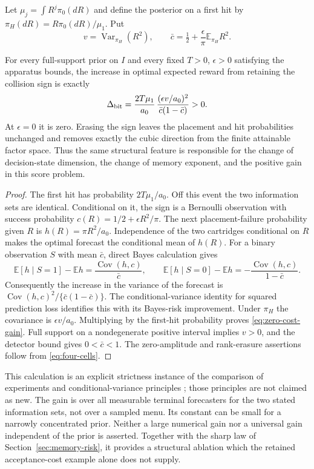 Let $\mu_j=\int R^j\pi_0(dR)$ and define the posterior on a first hit by
$\pi_H(dR)=R\pi_0(dR)/\mu_1$. Put
\[
 v=\operatorname{Var}_{\pi_H}(R^2),\qquad
 \bar c=\tfrac12+\frac\epsilon\pi\mathbb E_{\pi_H}R^2.
\]
\begin{theorem}\label{thm:zero-cost-gain}
For every full-support prior on $I$ and every fixed $T>0$, $\epsilon>0$
satisfying the apparatus bounds, the increase in optimal expected reward
from retaining the collision sign is exactly
\begin{equation}\label{eq:zero-cost-gain}
 \Delta_{\rm bit}
 =\frac{2T\mu_1}{a_0}\,
   \frac{(\epsilon v/a_0)^2}{\bar c(1-\bar c)}
 >0.
\end{equation}
At $\epsilon=0$ it is zero. Erasing the sign leaves the placement and hit
probabilities unchanged and removes exactly the cubic direction from the
finite attainable factor space. Thus the same structural feature is
responsible for the change of decision-state dimension, the change of
memory exponent, and the positive gain in this score problem.
\end{theorem}
\begin{proof}
The first hit has probability $2T\mu_1/a_0$. Off this event the two
information sets are identical. Conditional on it, the sign is a Bernoulli
observation with success probability
$c(R)=1/2+\epsilon R^2/\pi$. The next placement-failure probability given
$R$ is $h(R)=\pi R^2/a_0$. Independence of the two cartridges conditional
on $R$ makes the optimal forecast the conditional mean of $h(R)$.
For a binary observation $S$ with mean $\bar c$, direct Bayes calculation
gives
\[
 \mathbb E[h\mid S=1]-\mathbb E h
     =\frac{\operatorname{Cov}(h,c)}{\bar c},\qquad
 \mathbb E[h\mid S=0]-\mathbb E h
     =-\frac{\operatorname{Cov}(h,c)}{1-\bar c}.
\]
Consequently the increase in the variance of the forecast is
$\operatorname{Cov}(h,c)^2/\{\bar c(1-\bar c)\}$. The conditional-variance
identity for squared prediction loss identifies this with its Bayes-risk
improvement. Under $\pi_H$ the covariance is
$\epsilon v/a_0$. Multiplying by the first-hit probability proves
\eqref{eq:zero-cost-gain}. Full support on a nondegenerate positive interval
implies $v>0$, and the detector bound gives $0<\bar c<1$. The zero-amplitude
and rank-erasure assertions follow from \eqref{eq:four-cells}.
\end{proof}

This calculation is an explicit strictness instance of the comparison of
experiments and conditional-variance principles \cite{Blackwell}; those
principles are not claimed as new. The gain is over all measurable terminal
forecasters for the two stated information sets, not over a sampled menu.
Its constant can be small for a narrowly concentrated prior. Neither a
large numerical gain nor a universal gain independent of the prior is
asserted. Together with the sharp law of Section~\ref{sec:memory-risk}, it
provides a structural ablation which the retained acceptance-cost example
alone does not supply.
